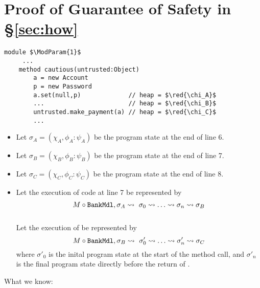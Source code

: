 \section{Proof of Guarantee of Safety in \S\ref{sec:how}}


\begin{lstlisting}[mathescape=true, language=chainmail, frame=lines]
module $\ModParam{1}$
     ...
    method cautious(untrusted:Object)
        a = new Account
        p = new Password
        a.set(null,p)             // heap = $\red{\chi_A}$
        ...                       // heap = $\red{\chi_B}$
        untrusted.make_payment(a) // heap = $\red{\chi_C}$
        ...
\end{lstlisting}
\begin{itemize}
\item
Let $\sigma_A = (\chi_A, \phi_A : \psi_A)$ be the program state at the end of line 6.
\item
Let $\sigma_B = (\chi_B, \phi_B : \psi_B)$ be the program state at the end of line 7.
\item
Let $\sigma_C = (\chi_C, \phi_C : \psi_C)$ be the program state at the end of line 8.
\item
Let the execution of code at line 7 be represented by $$M \circ {\texttt{BankMdl}}, \sigma_A \leadsto\ \sigma_0 \leadsto \ldots \leadsto \sigma_n \leadsto \sigma_B$$\\
Let the execution of  be represented by $$M \circ {\texttt{BankMdl}}, \sigma_B \leadsto\ \sigma'_0 \leadsto \ldots \leadsto \sigma'_n \leadsto \sigma_C$$
where $\sigma'_0$ is the inital program state at the start of the  method call, and $\sigma'_n$ is the final program state directly before the return of .
\end{itemize}
What we know:
